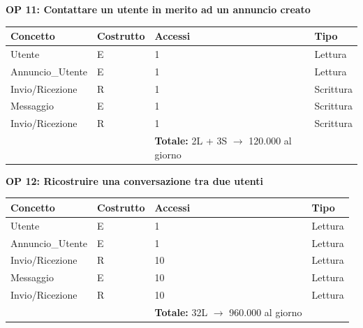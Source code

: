 \documentclass[a4paper,12pt]{report}
\begin{document}
            \textbf{OP 11: Contattare un utente in merito ad un annuncio creato}
        	\begin{table}[H]
            \centering
             \begin{tabular}{llll}
             \rowcolor{yellow!20} \textbf{Concetto} & \textbf{Costrutto} & \textbf{Accessi} & \textbf{Tipo}\\ [0.5ex] 
             \hline
             Utente & E & 1 & Lettura \\ 
             Annuncio\_Utente & E & 1 & Lettura \\ 
             Invio/Ricezione & R & 1 & Scrittura \\ 
             Messaggio & E & 1 & Scrittura \\ 
             Invio/Ricezione & R & 1 & Scrittura \\ 
             \hline
                \rowcolor{yellow!20} &   & \textbf{Totale:} 2L + 3S $\rightarrow$ 120.000 al giorno &  \\ [1ex] 
             
             \end{tabular}
            \end{table}

            \textbf{OP 12: Ricostruire una conversazione tra due utenti}
        	\begin{table}[H]
            \centering
             \begin{tabular}{llll}
             \rowcolor{yellow!20} \textbf{Concetto} & \textbf{Costrutto} & \textbf{Accessi} & \textbf{Tipo}\\ [0.5ex] 
             \hline
             Utente & E & 1 & Lettura \\ 
             Annuncio\_Utente & E & 1 & Lettura \\ 
             Invio/Ricezione & R & 10 & Lettura \\ 
             Messaggio & E & 10 & Lettura \\ 
             Invio/Ricezione & R & 10 & Lettura \\ 
             \hline
                \rowcolor{yellow!20} &   & \textbf{Totale:} 32L $\rightarrow$ 960.000 al giorno &  \\ [1ex] 
             
             \end{tabular}
            \end{table}
\end{document}
